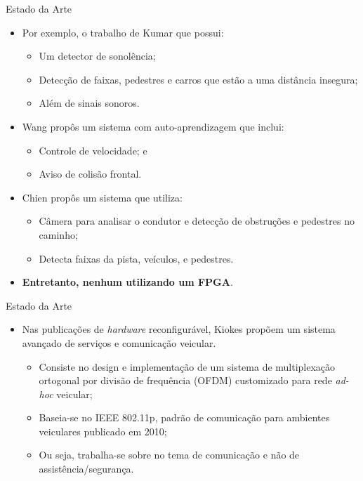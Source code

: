 \documentclass[aspectratio=169]{beamer}
\begin{document}
\begin{frame}{Estado da Arte}
	\begin{itemize}
		\item Por exemplo, o trabalho de Kumar \cite{seis} que possui:
		\begin{itemize}
			\item Um detector de sonolência;
			\item Detecção de faixas, pedestres e carros que estão a uma distância insegura;
			\item Além de sinais sonoros.
		\end{itemize} 
		
			\bigskip
		
		\item Wang \cite{sete} propôs um sistema com auto-aprendizagem que inclui:
		\begin{itemize}
			\item Controle de velocidade; e 
			\item Aviso de colisão frontal.
		\end{itemize} 
		
			\bigskip
		
		\item Chien \cite{oito} propôs um sistema que utiliza:
		\begin{itemize}
			\item  Câmera para analisar o condutor e detecção de obstruções e pedestres no caminho;
			\item Detecta faixas da pista, veículos, e pedestres.
		\end{itemize}
		
		\bigskip
		\pause
		\item \textbf{Entretanto, nenhum utilizando um FPGA}. 
		
	\end{itemize}
\end{frame}
		
\begin{frame}{Estado da Arte}
	\begin{itemize}
		\item Nas publicações de \textit{hardware} reconfigurável, Kiokes \cite{kiokes2011design} propõem um sistema avançado de serviços e comunicação veicular. 
		\begin{itemize}
			\item Consiste no design e implementação de um sistema de multiplexação ortogonal por divisão de frequência (OFDM) customizado para rede \textit{ad-hoc} veicular;
			\item Baseia-se no IEEE 802.11p, padrão de comunicação para ambientes veiculares publicado em 2010;
			\item Ou seja, trabalha-se sobre no tema de comunicação e não de assistência/segurança.
		\end{itemize}
	\end{itemize}
\end{frame}
\end{document}
